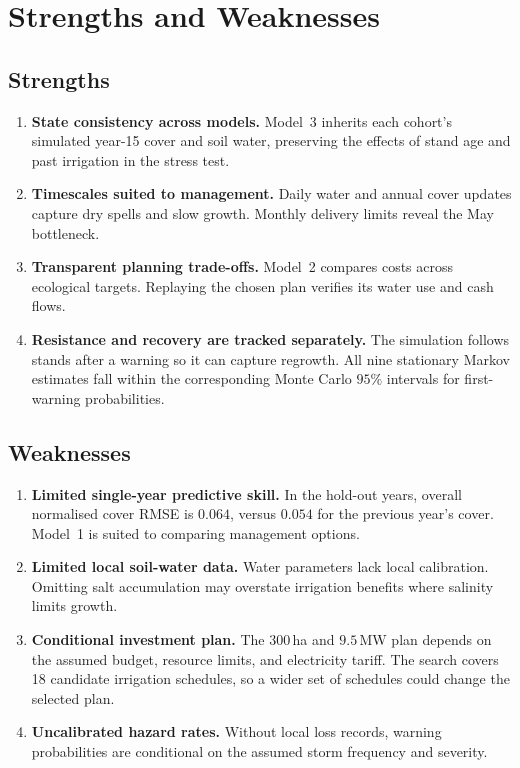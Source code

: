 \documentclass{mcmthesis}
\begin{document}
\section{Strengths and Weaknesses}

\subsection{Strengths}
\begin{enumerate}
  \setlength{\itemsep}{2pt}
  \setlength{\parsep}{0pt}
  \item \textbf{State consistency across models.} Model~3 inherits each cohort's simulated year-15 cover and soil water, preserving the effects of stand age and past irrigation in the stress test.
  \item \textbf{Timescales suited to management.} Daily water and annual cover updates capture dry spells and slow growth. Monthly delivery limits reveal the May bottleneck.
  \item \textbf{Transparent planning trade-offs.} Model~2 compares costs across ecological targets. Replaying the chosen plan verifies its water use and cash flows.
  \item \textbf{Resistance and recovery are tracked separately.} The simulation follows stands after a warning so it can capture regrowth. All nine stationary Markov estimates fall within the corresponding Monte Carlo $95\%$ intervals for first-warning probabilities.
\end{enumerate}

\subsection{Weaknesses}
\begin{enumerate}
  \setlength{\itemsep}{2pt}
  \setlength{\parsep}{0pt}
  \item \textbf{Limited single-year predictive skill.} In the hold-out years, overall normalised cover RMSE is $0.064$, versus $0.054$ for the previous year's cover. Model~1 is suited to comparing management options.
  \item \textbf{Limited local soil-water data.} Water parameters lack local calibration. Omitting salt accumulation may overstate irrigation benefits where salinity limits growth.
  \item \textbf{Conditional investment plan.} The $300$\,ha and $9.5$\,MW plan depends on the assumed budget, resource limits, and electricity tariff. The search covers 18 candidate irrigation schedules, so a wider set of schedules could change the selected plan.
  \item \textbf{Uncalibrated hazard rates.} Without local loss records, warning probabilities are conditional on the assumed storm frequency and severity.
\end{enumerate}





\end{document}
